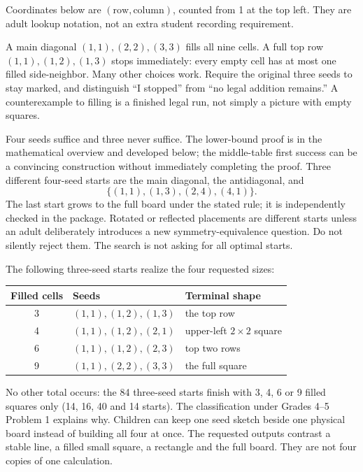 \newpage
{}
Coordinates below are $(\text{row},\text{column})$, counted from 1 at the top left. They are adult lookup notation, not an extra student recording requirement.

A main diagonal $(1,1),(2,2),(3,3)$ fills all nine cells. A full top row $(1,1),(1,2),(1,3)$ stops immediately: every empty cell has at most one filled side-neighbor. Many other choices work. Require the original three seeds to stay marked, and distinguish ``I stopped'' from ``no legal addition remains.'' A counterexample to filling is a finished legal run, not simply a picture with empty squares.

Four seeds suffice and three never suffice. The lower-bound proof is in the mathematical overview and developed below; the middle-table first success can be a convincing construction without immediately completing the proof. Three different four-seed starts are the main diagonal, the antidiagonal, and
\[
\{(1,1),(1,3),(2,4),(4,1)\}.
\]
The last start grows to the full board under the stated rule; it is independently checked in the package. Rotated or reflected placements are different starts unless an adult deliberately introduces a new symmetry-equivalence question. Do not silently reject them. The search is not asking for all optimal starts.

The following three-seed starts realize the four requested sizes:
\begin{center}\renewcommand{\arraystretch}{1.3}
\begin{tabular}{c l l}
Filled cells & Seeds & Terminal shape\\\midrule
3 & $(1,1),(1,2),(1,3)$ & the top row\\
4 & $(1,1),(1,2),(2,1)$ & upper-left $2\times2$ square\\
6 & $(1,1),(1,2),(2,3)$ & top two rows\\
9 & $(1,1),(2,2),(3,3)$ & the full square
\end{tabular}\end{center}
No other total occurs: the 84 three-seed starts finish with 3, 4, 6 or 9 filled squares only (14, 16, 40 and 14 starts). The classification under Grades 4--5 Problem 1 explains why. Children can keep one seed sketch beside one physical board instead of building all four at once. The requested outputs contrast a stable line, a filled small square, a rectangle and the full board. They are not four copies of one calculation.

